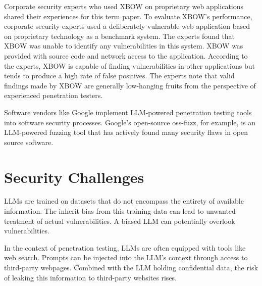 Corporate security experts who used XBOW on proprietary web applications shared their experiences for this term paper. To evaluate XBOW's performance, corporate security experts used a deliberately vulnerable web application based on proprietary technology as a benchmark system. The experts found that XBOW was unable to identify any vulnerabilities in this system. XBOW was provided with source code and network access to the application. According to the experts, XBOW is capable of finding vulnerabilities in other applications but tends to produce a high rate of false positives. The experts note that valid findings made by XBOW are generally low-hanging fruits from the perspective of experienced penetration testers.

Software vendors like Google implement \ac{LLM}-powered penetration testing tools into software security processes. Google's open-source oss-fuzz, for example, is an \ac{LLM}-powered fuzzing tool that has actively found many security flaws in open source software. \cite{Happe_2025}

\section{Security Challenges}
\label{sec:chapter05:sec_challenges}
\ac{LLM}s are trained on datasets that do not encompass the entirety of available information. The inherit bias from this training data can lead to unwanted treatment of actual vulnerabilities. A biased \ac{LLM} can potentially overlook vulnerabilities. \cite{Hilario_2024}

In the context of penetration testing, \ac{LLM}s are often equipped with tools like web search. Prompts can be injected into the \ac{LLM}'s context through access to third-party webpages. Combined with the \ac{LLM} holding confidential data, the risk of leaking this information to third-party websites rises.

